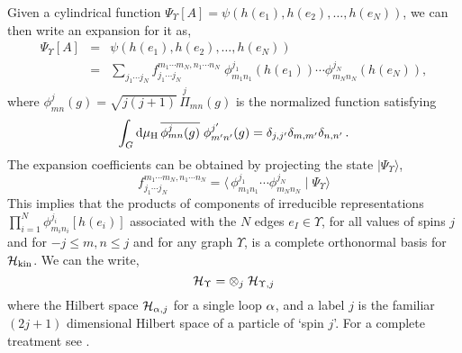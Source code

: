 \documentclass[aps,prd,tightenlines,showpacs,nofootinbib,preprint]{revtex4}
\def\ba{\begin{eqnarray}}
\def\ea{\end{eqnarray}}
\def\be{\begin{equation}}
\def\ee{\end{equation}}
\def\d{{\rm d}}
\begin{document}
Given a cylindrical function
$\Psi_\Upsilon[A]=\psi(h(e_1),h(e_2),\ldots,h(e_N))$, we can then
write an expansion for it as,
%
\ba
\Psi_\Upsilon[A] &=& \psi(h(e_1),h(e_2),\ldots,h(e_N))\nonumber\\
& = & \sum_{j_1\cdots j_N}f^{m_1\cdots m_N,n_1\cdots
n_N}_{j_1\cdots j_N}
\;\phi^{j_1}_{m_1n_1}(h(e_1))\cdots\phi^{j_N}_{m_Nn_N}(h(e_N)),
\ea
where $\phi^{j}_{mn}(g)=\sqrt{j(j+1)}\,\stackrel{j}{\Pi}_{m
n}(g)$ is the normalized function satisfying
%
$$
\int_G \d\mu_{\rm H}\,\overline{\phi^{j}_{mn}(g)}\;\phi^{j'}_{m' n'}(g)=
\delta_{j,j'}
\delta_{m,m'}\delta_{n,n'}\, .
$$
The expansion coefficients can be obtained by projecting the state
$|\Psi_\Upsilon\rangle$,
%
\be
f^{m_1\cdots m_N,n_1\cdots n_N}_{j_1\cdots j_N} =\langle
\,\phi^{j_1}_{m_1n_1}\cdots\phi^{j_N}_{m_Nn_N}\;|\;\Psi_\Upsilon
\rangle
\ee
%
This implies that the products of components of irreducible
representations $\prod^{N}_{i=1}\phi^{j_i}_{m_i n_i}[h(e_i)]$
associated with the $N$ edges $e_I\in\Upsilon$, for all values of
spins $j$ and for $-j\leq m,n\leq j$ and for any graph $\Upsilon$,
is a complete orthonormal basis for ${\cal H}_{\rm kin}$. We can
the write, \be {\cal H}_\Upsilon=\otimes_j\;{\cal H}_{\Upsilon,j}
\ee where the Hilbert space ${\cal H}_{{\alpha},j}$ for a single loop
${\alpha}$, and a label $j$ is the familiar $(2j+1)$ dimensional Hilbert
space of a particle of `spin $j$'. For a complete treatment see
\cite{Perez:2004hj}.
\end{document}
